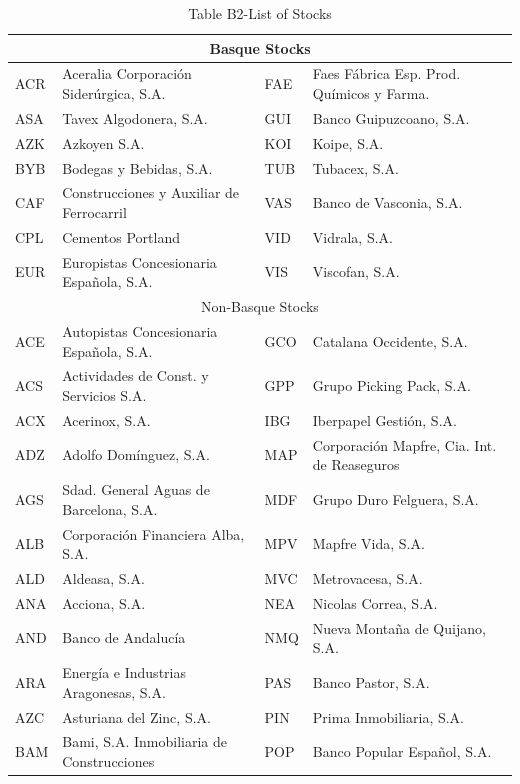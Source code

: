 \documentclass[10pt]{article}
\begin{document}
\begin{table}[h]
\begin{center}
\captionsetup{labelformat=empty}
\caption{Table B2-List of Stocks}
\begin{tabular}{|l|l|l|l|}
\hline
\multicolumn{4}{|c|}{Basque Stocks} \\
\hline
ACR & Aceralia Corporación Siderúrgica, S.A. & FAE & Faes Fábrica Esp. Prod. Químicos y Farma. \\
\hline
ASA & Tavex Algodonera, S.A. & GUI & Banco Guipuzcoano, S.A. \\
\hline
AZK & Azkoyen S.A. & KOI & Koipe, S.A. \\
\hline
BYB & Bodegas y Bebidas, S.A. & TUB & Tubacex, S.A. \\
\hline
CAF & Construcciones y Auxiliar de Ferrocarril & VAS & Banco de Vasconia, S.A. \\
\hline
CPL & Cementos Portland & VID & Vidrala, S.A. \\
\hline
EUR & Europistas Concesionaria Española, S.A. & VIS & Viscofan, S.A. \\
\hline
\multicolumn{4}{|c|}{Non-Basque Stocks} \\
\hline
ACE & Autopistas Concesionaria Española, S.A. & GCO & Catalana Occidente, S.A. \\
\hline
ACS & Actividades de Const. y Servicios S.A. & GPP & Grupo Picking Pack, S.A. \\
\hline
ACX & Acerinox, S.A. & IBG & Iberpapel Gestión, S.A. \\
\hline
ADZ & Adolfo Domínguez, S.A. & MAP & Corporación Mapfre, Cia. Int. de Reaseguros \\
\hline
AGS & Sdad. General Aguas de Barcelona, S.A. & MDF & Grupo Duro Felguera, S.A. \\
\hline
ALB & Corporación Financiera Alba, S.A. & MPV & Mapfre Vida, S.A. \\
\hline
ALD & Aldeasa, S.A. & MVC & Metrovacesa, S.A. \\
\hline
ANA & Acciona, S.A. & NEA & Nicolas Correa, S.A. \\
\hline
AND & Banco de Andalucía & NMQ & Nueva Montaña de Quijano, S.A. \\
\hline
ARA & Energía e Industrias Aragonesas, S.A. & PAS & Banco Pastor, S.A. \\
\hline
AZC & Asturiana del Zinc, S.A. & PIN & Prima Inmobiliaria, S.A. \\
\hline
BAM & Bami, S.A. Inmobiliaria de Construcciones & POP & Banco Popular Español, S.A. \\

\end{tabular}
\end{center}
\end{table}
\end{document}
